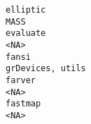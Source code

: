 \documentclass[
  letterpaper,
  DIV=11,
  numbers=noendperiod]{scrreprt}
\begin{document}
\begin{verbatim}
elliptic                                                                                                                                                                                                                                                                                                                                                                                                                                                                                                                                                                                                              MASS
evaluate                                                                                                                                                                                                                                                                                                                                                                                                                                                                                                                                                                                                              <NA>
fansi                                                                                                                                                                                                                                                                                                                                                                                                                                                                                                                                                                                                     grDevices, utils
farver                                                                                                                                                                                                                                                                                                                                                                                                                                                                                                                                                                                                                <NA>
fastmap                                                                                                                                                                                                                                                                                                                                                                                                                                                                                                                                                                                                               <NA>

\end{verbatim}
\end{document}
